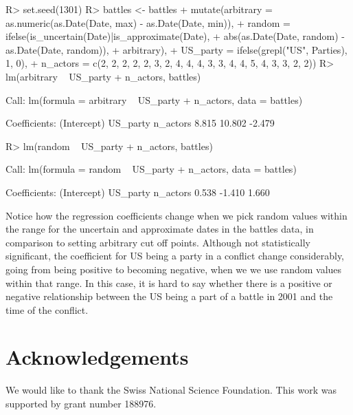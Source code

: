 \documentclass[
]{jss}
\begin{document}
\begin{CodeChunk}
\begin{CodeInput}
R> set.seed(1301)
R> battles <- battles %
+   mutate(arbitrary = as.numeric(as.Date(Date, max) - as.Date(Date, min)),
+          random = ifelse(is_uncertain(Date)|is_approximate(Date),
+                          abs(as.Date(Date, random) - as.Date(Date, random)),
+                          arbitrary),
+          US_party = ifelse(grepl("US", Parties), 1, 0),
+          n_actors = c(2, 2, 2, 2, 2, 3, 2, 4, 4, 4, 3, 3, 4, 4, 5, 4, 3, 3, 2, 2))
R> lm(arbitrary ~ US_party + n_actors, battles)
\end{CodeInput}
\begin{CodeOutput}

Call:
lm(formula = arbitrary ~ US_party + n_actors, data = battles)

Coefficients:
(Intercept)     US_party     n_actors  
      8.815       10.802       -2.479  
\end{CodeOutput}
\begin{CodeInput}
R> lm(random ~ US_party + n_actors, battles)
\end{CodeInput}
\begin{CodeOutput}

Call:
lm(formula = random ~ US_party + n_actors, data = battles)

Coefficients:
(Intercept)     US_party     n_actors  
      0.538       -1.410        1.660  
\end{CodeOutput}
\end{CodeChunk}

Notice how the regression coefficients change when we pick random values
within the range for the uncertain and approximate dates in the battles
data, in comparison to setting arbitrary cut off points. Although not
statistically significant, the coefficient for US being a party in a
conflict change considerably, going from being positive to becoming
negative, when we we use random values within that range. In this case,
it is hard to say whether there is a positive or negative relationship
between the US being a part of a battle in 2001 and the time of the
conflict.

\hypertarget{acknowledgements}{%
\section{Acknowledgements}\label{acknowledgements}}

We would like to thank the Swiss National Science Foundation. This work
was supported by grant number 188976.

\renewcommand\refname{References}

\end{document}
